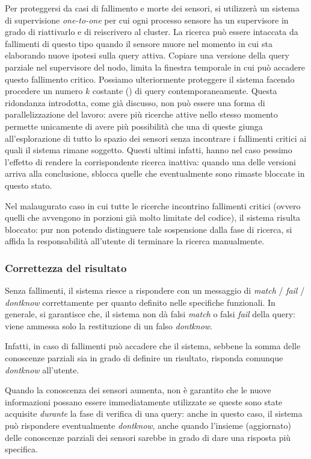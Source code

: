 \documentclass{llncs}
\begin{document}
Per proteggersi da casi di fallimento e morte dei sensori,
si utilizzerà un sistema di supervisione \emph{one-to-one}
per cui ogni processo sensore ha un supervisore in grado di
riattivarlo e di reiscrivero al cluster.
La ricerca può essere intaccata da fallimenti di questo tipo
quando il sensore muore nel momento in cui sta elaborando
nuove ipotesi sulla query attiva.
Copiare una versione della query parziale nel supervisore del nodo,
limita la finestra temporale in cui può accadere questo fallimento
critico.
Possiamo ulteriormente proteggere il sistema facendo procedere
un numero $k$ costante () di query
contemporaneamente. Questa ridondanza introdotta, come già discusso,
non può essere una forma di parallelizzazione del lavoro: avere
più ricerche attive nello stesso momento permette unicamente di
avere più possibilità che una di queste giunga all'esplorazione
di tutto lo spazio dei sensori senza incontrare i fallimenti critici
ai quali il sistema rimane soggetto.
Questi ultimi infatti, hanno nel caso pessimo l'effetto di
rendere la corrispondente ricerca inattiva: quando una delle versioni
arriva alla conclusione, sblocca quelle che eventualmente sono rimaste
bloccate in questo stato.

Nel malaugurato caso in cui tutte le ricerche incontrino fallimenti
critici (ovvero quelli che avvengono in porzioni già molto limitate
del codice), il sistema risulta bloccato: pur non potendo
distinguere tale sospensione dalla fase di ricerca, si affida
la responsabilità all'utente di terminare la ricerca manualmente.

\subsubsection*{Correttezza del risultato}
Senza fallimenti, il sistema riesce a rispondere con un messaggio di
\emph{match} / \emph{fail} / \emph{dontknow} correttamente
per quanto definito nelle specifiche funzionali.
In generale, si garantisce che,
il sistema non dà falsi \emph{match} o falsi \emph{fail} della query:
viene ammessa solo la restituzione di un falso \emph{dontknow}.

Infatti,
in caso di fallimenti può accadere che il sistema, sebbene la somma
delle conoscenze parziali sia in grado di definire un risultato,
risponda comunque \emph{dontknow} all'utente.

Quando la conoscenza dei sensori aumenta,
non è garantito che le nuove informazioni possano essere immediatamente
utilizzate se queste sono state acquisite \emph{durante} la fase di verifica
di una query: anche in questo caso, il sistema può rispondere eventualmente
\emph{dontknow}, anche quando l'insieme (aggiornato) delle conoscenze parziali
dei sensori sarebbe in grado di dare una risposta più specifica.

\end{document}
